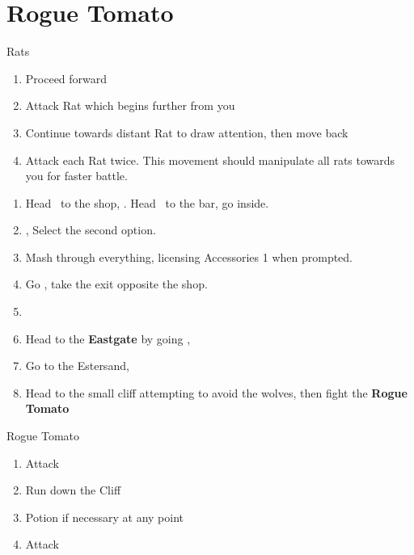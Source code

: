 \chapter{Rogue Tomato}
\begin{battle}{Rats}
	\begin{enumerate}
		\item Proceed forward
		\item Attack Rat which begins further from you
		\item Continue towards distant Rat to draw attention, then move back
		\item Attack each Rat twice. This movement should manipulate all rats towards you for faster battle.
	\end{enumerate}
\end{battle}
\begin{enumerate}
	\item Head \south\ to the shop, \cs. Head \north\ to the bar, go inside.
	\item \cs, Select the second option.
	\item Mash through everything, licensing Accessories 1 when prompted.
	\item Go \south, take the exit opposite the shop.
	\item {}
	\item Head to the \textbf{Eastgate} by going \east, \cs
	\item Go to the Estersand, \cs
	\item Head to the small cliff attempting to avoid the wolves, then fight the \textbf{Rogue Tomato}
\end{enumerate}
\begin{battle}{Rogue Tomato}
	\begin{enumerate}
		\item Attack
		\item Run down the Cliff
		\item Potion if necessary at any point
		\item Attack
	\end{enumerate}
\end{battle}